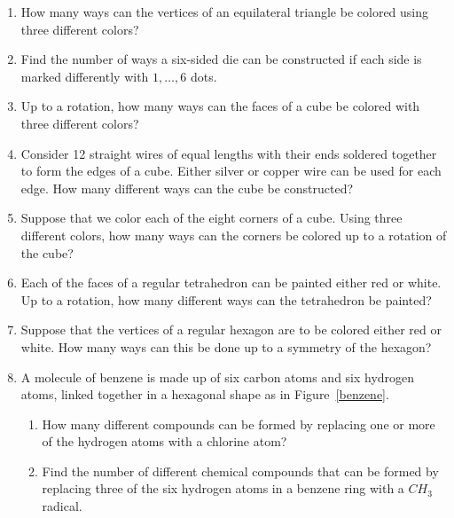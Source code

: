 \begin{example}
{\begin{enumerate}
 
\bf\item\rm
How many ways can the vertices of an equilateral triangle be colored
using three different colors? 
 
 
\bf\item\rm
Find the number of ways a six-sided die can be constructed if each
side is  marked differently with $1, \ldots, 6$ 
dots.
 
\bf\item\rm
Up to a rotation, how many ways can the faces of a cube be colored
with three different colors? 
 
 
 
\bf\item\rm
Consider 12 straight wires of equal lengths with their ends soldered
together to form the edges of a cube. Either silver or copper wire can be
used for each edge.  How many different ways can the cube be
constructed? 
 
 
 
\bf\item\rm
Suppose that we color each of the eight corners of a cube. Using three
different colors, how many ways can the corners be colored up to a
rotation of the cube? 
 
 
\bf\item\rm
Each of the faces of a regular tetrahedron can be painted either red
or white.  Up to a rotation, how many different ways can the
tetrahedron be painted? 
 
 
\bf\item\rm
Suppose that the vertices of a regular hexagon are to be colored either
red or white.  How many ways can this be done up to a symmetry  of the
hexagon? 
 
 
\bf\item\rm
A molecule of benzene is made up of six carbon atoms and six hydrogen
atoms, linked together in a hexagonal shape as in Figure~\ref{benzene}.
\begin{enumerate}
 
 \bf\item\rm
How many different compounds can be formed by replacing one or more of
the hydrogen atoms with a chlorine atom? 
 
 \bf\item\rm
Find the number of different chemical compounds that can be formed by
replacing three of the six hydrogen atoms in a benzene ring with a
$CH_3$ radical.
 
\end{enumerate}
 

\end{enumerate}}
\end{example}
